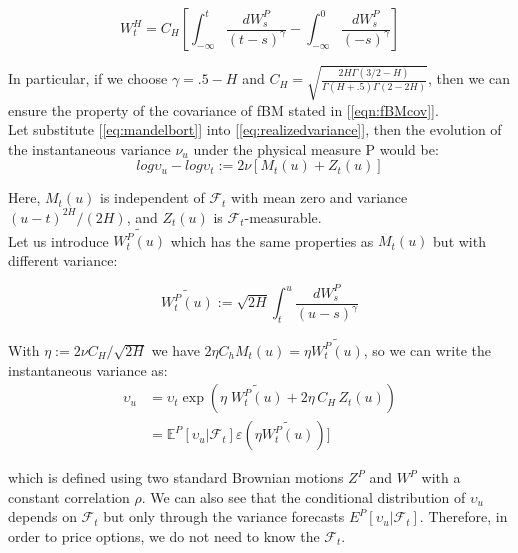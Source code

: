 \documentclass[12pt,oneside]{article}
\begin{document}
\begin{equation}
\label{eq:mandelbort}
    W_{t}^{H} = C_{H} [\int_{-\infty}^{t} \frac{dW_{s}^{P}}{(t-s)^{\gamma}} - \int_{-\infty}^{0} \frac{dW_{s}^{P}}{(-s)^{\gamma}}]
\end{equation}


In particular, if we choose $\gamma = .5-H$ and $C_{H} = \sqrt{\frac{2H\Gamma(3/2- H)}{\Gamma(H+.5) \Gamma(2-2H)}}$, then we can ensure the property of the covariance of fBM stated in [\ref{eqn:fBMcov}].
\\

Let substitute [\ref{eq:mandelbort}] into [\ref{eq:realizedvariance}], then the evolution of the instantaneous variance $\nu_{u}$ under the physical measure P would be:
\begin{equation}
    log\upsilon_{u} - log\upsilon_{t} := 2  \nu [M_{t}(u) + Z_{t}(u)]
\end{equation}

Here, $M_{t}(u)$ is independent of $\mathcal{F}_{t}$ with mean zero and variance $(u-t)^{2H} /(2H)$, and $Z_{t}(u)$ is $\mathcal{F}_{t}$-measurable.
\\

Let us introduce  $\tilde{W_{t}^{P}(u)}$ which has the same properties as $M_{t}(u)$ but with different variance:

\begin{equation}
    \tilde{W_{t}^{P}(u)}:= \sqrt{2H} \int_{t}^{u} \frac{dW_{s}^{P}}{(u-s)^\gamma}
\end{equation}

With $\eta := 2 \nu C_{H}/ \sqrt{2H}$ we have $2\eta C_{h} M_{t}(u) = \eta \tilde{W_{t}^{P}(u)}$, so we can write the instantaneous variance as:
\begin{equation}
\label{eq:volunderP}
\begin{split}
    \upsilon_{u} & = \upsilon_{t} \exp{(\eta\; \tilde{W_{t}^{P}(u)} + 2\eta\,C_{H}\,Z_{t}(u))} \\
    & = \mathbb{E}^{P} [\upsilon_{u}| \mathcal{F}_{t}] \varepsilon (\eta \tilde{W_{t}^{P}(u)})]
\end{split}
\end{equation}
 
 which is defined using two standard Brownian motions $Z^{P}$ and $W^{P}$ with a constant correlation $\rho$. We can also see that the conditional distribution of $\upsilon_{u}$ depends on $\mathcal{F}_{t}$ but only through the variance forecasts $E^{P} [\upsilon_{u}| \mathcal{F}_{t}]$. Therefore, in order to price options, we do not need to know the $\mathcal{F}_{t}$.
\\
\end{document}
